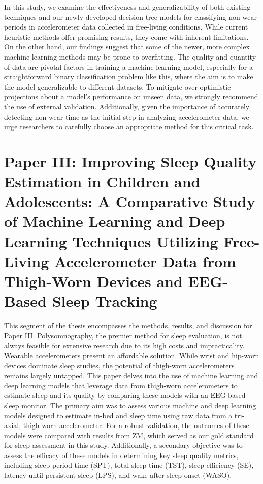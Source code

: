 \documentclass[
  10pt,
]{scrbook}
\begin{document}
In this study, we examine the effectiveness and generalizability of both
existing techniques and our newly-developed decision tree models for
classifying non-wear periods in accelerometer data collected in
free-living conditions. While current heuristic methods offer promising
results, they come with inherent limitations. On the other hand, our
findings suggest that some of the newer, more complex machine learning
methods may be prone to overfitting. The quality and quantity of data
are pivotal factors in training a machine learning model, especially for
a straightforward binary classification problem like this, where the aim
is to make the model generalizable to different datasets. To mitigate
over-optimistic projections about a model's performance on unseen data,
we strongly recommend the use of external validation. Additionally,
given the importance of accurately detecting non-wear time as the
initial step in analyzing accelerometer data, we urge researchers to
carefully choose an appropriate method for this critical task.

\hypertarget{paper-iii-improving-sleep-quality-estimation-in-children-and-adolescents-a-comparative-study-of-machine-learning-and-deep-learning-techniques-utilizing-free-living-accelerometer-data-from-thigh-worn-devices-and-eeg-based-sleep-tracking}{%
\chapter{Paper III: Improving Sleep Quality Estimation in Children and
Adolescents: A Comparative Study of Machine Learning and Deep Learning
Techniques Utilizing Free-Living Accelerometer Data from Thigh-Worn
Devices and EEG-Based Sleep
Tracking}\label{paper-iii-improving-sleep-quality-estimation-in-children-and-adolescents-a-comparative-study-of-machine-learning-and-deep-learning-techniques-utilizing-free-living-accelerometer-data-from-thigh-worn-devices-and-eeg-based-sleep-tracking}}

This segment of the thesis encompasses the methods, results, and
discussion for Paper III. Polysomnography, the premier method for sleep
evaluation, is not always feasible for extensive research due to its
high costs and impracticality. Wearable accelerometers present an
affordable solution. While wrist and hip-worn devices dominate sleep
studies, the potential of thigh-worn accelerometers remains largely
untapped. This paper delves into the use of machine learning and deep
learning models that leverage data from thigh-worn accelerometers to
estimate sleep and its quality by comparing these models with an
EEG-based sleep monitor. The primary aim was to assess various machine
and deep learning models designed to estimate in-bed and sleep time
using raw data from a tri-axial, thigh-worn accelerometer. For a robust
validation, the outcomes of these models were compared with results from
ZM, which served as our gold standard for sleep assessment in this
study. Additionally, a secondary objective was to assess the efficacy of
these models in determining key sleep quality metrics, including sleep
period time (SPT), total sleep time (TST), sleep efficiency (SE),
latency until persistent sleep (LPS), and wake after sleep onset (WASO).
\end{document}

